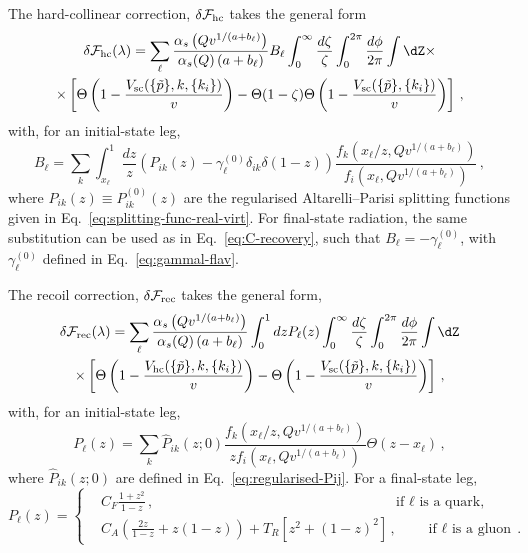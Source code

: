 The hard-collinear correction, $\delta \mathcal{F}_{\rm hc}$ takes the general form
 \begin{multline}
   \label{eq:dFhc-ISR}
   \delta\mathcal{F}_{\rm hc}(\lambda)=\sum_\ell \frac{\alpha_s\left(Qv^{1/(a+b_\ell)}\right)}{\alpha_s(Q)\left(a+b_\ell\right)}B_\ell \int_0^{\infty}\frac{d\zeta}{\zeta}\int_0^{2\pi}\frac{d\phi}{2\pi}
 \int \dZ  \times\\ \times  \left[\Theta\left(1-\frac{V_{\mathrm{sc}}(\{\tilde{p}\},k,\{k_i\})}{v}\right) -\Theta(1-\zeta)\Theta\left(1-\frac{V_{\mathrm{sc}}(\{\tilde{p}\},\{k_i\})}{v}\right)\right]\,,
 \end{multline}
with, for an initial-state leg,
 \begin{equation}
   \label{eq:Bell-ISR}
B_\ell=\sum_k\int_{x_{\ell}}^1 \frac{dz}{z} \left(P_{ik}(z)-\gamma_\ell^{(0)}\delta_{ik}\delta(1-z)\right) \frac{f_k(x_{\ell}/z,Qv^{1/(a+b_\ell)})}{f_i(x_\ell,Qv^{1/(a+b_\ell)})}  \,,
 \end{equation}
 where $P_{ik}(z) \equiv P^{(0)}_{ik}(z)$ are the regularised
 Altarelli--Parisi splitting functions given in
 Eq.~\eqref{eq:splitting-func-real-virt}.
  For final-state radiation, the same substitution can be
  used as in Eq.~\eqref{eq:C-recovery}, such that $B_\ell=-\gamma_\ell^{(0)}$,
 with $\gamma_\ell^{(0)}$ defined in Eq.~\eqref{eq:gammal-flav}.

The recoil correction, $\delta\mathcal{F}_{\rm rec}$ takes the general form,
 \begin{multline}
   \label{eq:dFrec-ISR}
   \delta\mathcal{F}_{\rm rec}(\lambda)=\sum_\ell \frac{\alpha_s\left(Qv^{1/(a+b_\ell)}\right)}{\alpha_s(Q)\left(a+b_\ell\right)}\int_0^1 dz P_\ell(z) \int_0^{\infty}\frac{d\zeta}{\zeta}\int_0^{2\pi}\frac{d\phi}{2\pi}
 \int \dZ  \\ \times  \left[\Theta\left(1-\frac{V_{\mathrm{hc}}(\{\tilde{p}\},k,\{k_i\})}{v}\right) -\Theta\left(1-\frac{V_{\mathrm{sc}}(\{\tilde{p}\},k,\{k_i\})}{v}\right)\right]\,,
\end{multline}
with, for an initial-state leg, 
\begin{equation}
  \label{eq:Pell-ISR}
  P_\ell(z)=\sum_k \hat P_{ik}(z;0) \frac{f_k(x_\ell/z,Qv^{1/(a+b_\ell)})}{z f_i(x_\ell,Qv^{1/(a+b_\ell)})} \Theta(z-x_\ell)\,,
\end{equation}
where $ \hat P_{ik}(z;0)$ are defined in Eq.~\eqref{eq:regularised-Pij}.
For a final-state leg, 
\begin{equation}
  \label{eq:Pell-FSR}
  P_\ell(z)=\left\{
    \begin{split}
      &C_F \frac{1+z^2}{1-z}\,,\qquad\qquad\qquad\qquad\qquad\qquad\qquad\qquad\quad\text{if $\ell$ is a quark,}\\
      &C_A\left(\frac{2z}{1-z}+z(1-z)\right)+T_R\left[z^2+(1-z)^2\right]\,,\qquad\text{if $\ell$ is a gluon}\,.
    \end{split}
  \right.
\end{equation}

